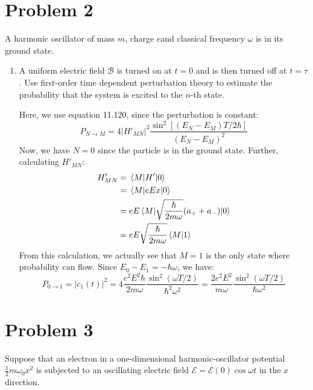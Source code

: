 \documentclass[10pt]{article}
\begin{document}
	\section*{Problem 2}
	A harmonic oscillator of mass $m$, charge $e$and classical frequency $\omega$ is in its ground state. 

	\begin{enumerate}[label=\alph*)]
		\item A uniform electric field $\mathscr B$ is turned on at $t =0$ and is then turned off at $t = \tau$.
			Use first-order time dependent perturbation theory to estimate the probability that the system is 
			excited to the $n$-th state. 

			\begin{solution}
				Here, we use equation 11.120, since the perturbation is constant:
				\[
					P_{N \to M} = 4|H'_{MN}|^2 \frac{\sin^2\left[(E_N - E_M)T/2\hbar\right]}{(E_N- E_M)^2}
				\] 
				Now, we have $N=0$ since the particle is in the ground state. Further, calculating $H'_{MN}$:
				\begin{align*}
					H'_{MN} &= \mel{M}{H'}{0} \\
							&= \mel{M}{eEx}{0} \\
							&= eE\mel{M}{\sqrt{\frac{\hbar}{2m\omega}} (a_+ + a_-)}{0}  \\
							&= eE\sqrt{\frac{\hbar}{2m\omega}} \braket{M}{1}
				\end{align*}
				From this calculation, we actually see that $M=1$ is the only state where probability can flow. 
				Since $E_0 - E_1 = -\hbar \omega$, we have:
				\[
					P_{0 \to 1} = |c_1(t)|^2 = 4 \frac{e^2 E^2 \hbar}{2m\omega} \frac{\sin^2(\omega T/2)}{\hbar^2
					\omega^2} = \frac{2e^2E^2}{m\omega} \frac{\sin^2(\omega T/2)}{\hbar \omega^2}
				\] 
			\end{solution}
	\end{enumerate}

	\pagebreak
	\section*{Problem 3}
	Suppose that an electron in a one-dimensional harmonic-oscillator potential $\frac{1}{2}m\omega_0x^2$ is 
	subjected to an oscillating electric field $\mathscr E = \mathscr E(0) \cos \omega t$ in the $x$ direction.
\end{document}
